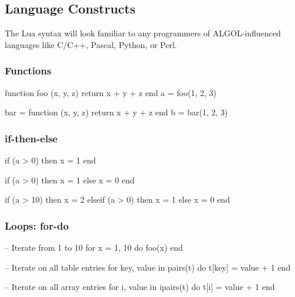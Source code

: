 \subsection{Language Constructs}

The Lua syntax will look familiar to any programmers of ALGOL-influenced
languages like C/C++, Pascal, Python, or Perl.   

\subsubsection{Functions}

\begin{LuaCode}
function foo (x, y, z)
	return x + y + z
end
a = foo(1, 2, 3)
\end{LuaCode}

\begin{LuaCode}
bar = function (x, y, z)
	return x + y + z
end
b = bar(1, 2, 3)
\end{LuaCode}

\subsubsection{if-then-else}

\begin{LuaCode}
if (a > 0) then
	x = 1
end
\end{LuaCode}

\begin{LuaCode}
if (a > 0) then
	x = 1
else
	x = 0
end
\end{LuaCode}

\begin{LuaCode}
if (a > 10) then
	x = 2
elseif (a > 0) then
	x = 1
else
	x = 0
end
\end{LuaCode}

\subsubsection{Loops: for-do}

\begin{LuaCode}
-- Iterate from 1 to 10
for x = 1, 10 do
	foo(x)
end
\end{LuaCode}

\begin{LuaCode}
-- Iterate on all table entries
for key, value in pairs(t) do
	t[key] = value + 1
end
\end{LuaCode}

\begin{LuaCode}
-- Iterate on all array entries
for i, value in ipairs(t) do
	t[i] = value + 1
end
\end{LuaCode}

